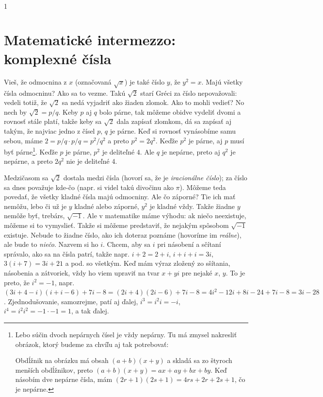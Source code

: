\documentclass[10pt]{article}
\def\ods{\vspace*{10pt}}
\def\sectxxiv{1} %
\def\sectxxiv{0} %
\begin{document}
{\fi

\if\sectxxiv1
\section{Matematické intermezzo: komplexné čísla}

Vieš, že odmocnina z $x$ (označovaná $\sqrt{x}$) je také číslo $y$, že $y^2=x$. 
Majú všetky čísla odmocninu? Ako sa to vezme. Takú $\sqrt{2}$
starí Gréci za číslo nepovažovali: vedeli totiž, že $\sqrt{2}$ sa nedá vyjadriť ako
žiaden zlomok. Ako to mohli vedieť? No nech by $\sqrt{2}=p/q$. Keby $p$ aj 
$q$ bolo párne, tak môžeme obidve vydeliť dvomi a rovnosť stále platí, takže keby
sa $\sqrt{2}$ dala zapísať zlomkom, dá sa zapísať aj takým, že najviac jedno z čísel
$p$, $q$ je párne. Keď si rovnosť vynásobíme samu sebou, máme 
$2=p/q\cdot p/q=p^2/q^2$ a preto $p^2=2q^2$.
Keďže $p^2$ je párne, aj $p$ musí byť párne\footnote{%
Lebo súčin dvoch nepárnych čísel je vždy nepárny. Tu má zmysel nakresliť obrázok, ktorý
budeme za chvíľu aj tak potrebovať:

  \centerline{}
Obdĺžnik na obrázku má obsah $(a+b)(x+y)$ a skladá sa zo štyroch menších obdĺžnikov,
preto $(a+b)(x+y)=ax+ay+bx+by$. Keď násobím dve nepárne čísla, mám 
$(2r+1)(2s+1)=4rs+2r+2s+1$, čo je nepárne.
}. Keďže $p$ je párne, $p^2$ je deliteľné $4$. Ale $q$ je nepárne, preto aj $q^2$ je nepárne,
a preto $2q^2$ nie je deliteľné 4. 

\ods
Medzičasom sa $\sqrt{2}$ dostala medzi čísla (hovorí sa, že je {\em iracionálne číslo});
za číslo sa dnes považuje kde-čo (napr. si videl takú divočinu ako $\pi$). Môžeme
teda povedať, že všetky kladné čísla majú odmocniny. Ale čo záporné? Tie ich mať
nemôžu, lebo či už je $y$ kladné alebo záporné, $y^2$ je kladné vždy. Takže žiadne
$y$ nemôže byť, trebárs, $\sqrt{-1}$. Ale v matematike máme výhodu: ak niečo neexistuje,
môžeme si to vymyslieť. Takže si môžeme predstaviť, že nejakým spôsobom $\sqrt{-1}$ existuje.
Nebude to žiadne číslo, ako ich doteraz poznáme (hovoríme im {\em reálne}), ale bude to 
{\em niečo}. Nazvem si ho $i$. Chcem, aby sa $i$ pri násobení a sčítaní
správalo, ako sa na čísla patrí,
takže napr. $i+2=2+i$, $i+i+i=3i$, $3(i+7)=3i+21$ a pod. so všetkým. 
Keď mám výraz zložený zo sšítania, násobenia a zátvoriek, vždy ho viem upraviť na
tvar $x+yi$ pre nejaké $x$, $y$. To je preto, že $i^2=-1$, napr.
$(3i+4-i)(i+i-6)+7i-8=(2i+4)(2i-6)+7i-8=4i^2-12i+8i-24+7i-8=3i-28$.
Zjednodušovanie, samozrejme, patí aj ďalej, $i^3=i^2i=-i$, $i^4=i^2i^2=-1\cdot-1=1$, a 
tak ďalej.

}
\end{document}
